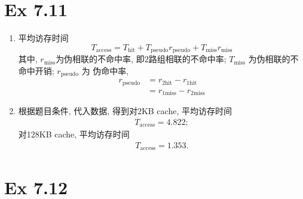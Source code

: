 \section{Ex 7.11}

\begin{solve}
  \begin{enumerate}
  \item 平均访存时间
    \begin{equation}
      T_{\mathrm{access}} = T_{\mathrm{hit}} + T_{\mathrm{pseudo}}r_{\mathrm{pseudo}}
      + T_{\mathrm{miss}}r_{\mathrm{miss}}
    \end{equation}
    其中, $r_{\mathrm{miss}}$为伪相联的不命中率, 即2路组相联的不命中率;
    $T_{\mathrm{miss}}$ 为伪相联的不命中开销; $r_{\mathrm{pseudo}}$ 为
    伪命中率,
    \begin{align}
      r_{\mathrm{pseudo}} &= r_{\mathrm{2hit}} - r_{\mathrm{1hit}} \\
      &= r_{\mathrm{1miss}} - r_{\mathrm{2miss}}
    \end{align}
  \item 根据题目条件, 代入数据, 得到对2KB cache, 平均访存时间
    \begin{align*}
      T_{\mathrm{access}} = 4.822;
    \end{align*}
    对128KB cache, 平均访存时间
    \begin{align*}
      T_{\mathrm{access}} = 1.353.
    \end{align*}

  \end{enumerate}
\end{solve}


\section{Ex 7.12}

